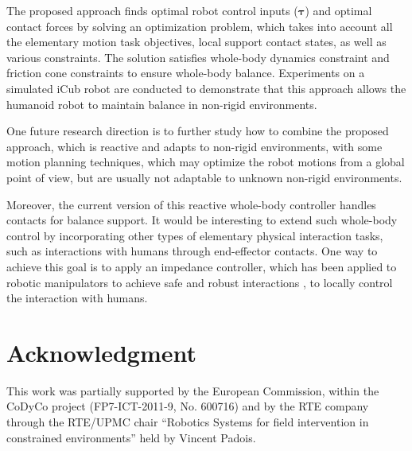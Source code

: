 \documentclass[letterpaper, 10 pt, conference]{ieeeconf}  %
\begin{document}
The proposed approach finds optimal robot control inputs ($\boldsymbol{\tau}$) and optimal contact forces by solving an optimization problem, which takes into account all the elementary motion task objectives, local support contact states, as well as various constraints. The solution satisfies whole-body dynamics constraint and friction cone constraints to ensure whole-body balance. 
Experiments on a simulated iCub robot are conducted to demonstrate that this approach allows the humanoid robot to maintain balance in non-rigid environments. 

One future research direction is to further study how to combine the proposed approach, which is reactive and adapts to non-rigid environments, with some motion planning techniques, which may optimize the robot motions from a global point of view, but are usually not adaptable to unknown non-rigid environments. 

Moreover, the current version of this reactive whole-body controller handles contacts for balance support. It would be interesting to extend such whole-body control by incorporating other types of elementary physical interaction tasks, such as interactions with humans through end-effector contacts. One way to achieve this goal is to apply an impedance controller, which has been applied to robotic manipulators to achieve safe and robust interactions \cite{Albu07,Yang11}, to locally control the interaction with humans.

\section*{Acknowledgment}
This work was partially supported by the European Commission, within the CoDyCo project (FP7-ICT-2011-9, No.
600716) and by the RTE company through the RTE/UPMC chair “Robotics Systems for field intervention in constrained environments” held by Vincent Padois.



\end{document}

